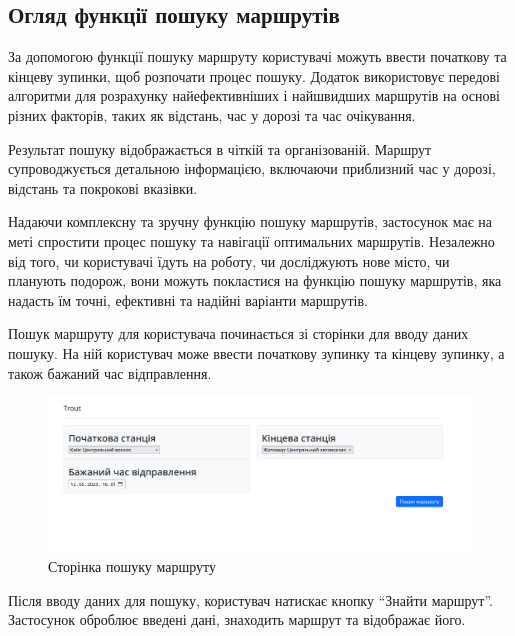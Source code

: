 \subsection{Огляд функції пошуку маршрутів}
\label{subsec:route-management-subsection}

За допомогою функції пошуку маршруту користувачі можуть ввести початкову та кінцеву зупинки, щоб розпочати процес пошуку. Додаток використовує передові алгоритми для розрахунку найефективніших і найшвидших маршрутів на основі різних факторів, таких як відстань, час у дорозі та час очікування.

Результат пошуку відображається в чіткій та організованій. Маршрут супроводжується детальною інформацією, включаючи приблизний час у дорозі, відстань та покрокові вказівки.

Надаючи комплексну та зручну функцію пошуку маршрутів, застосунок має на меті спростити процес пошуку та навігації оптимальних маршрутів. Незалежно від того, чи користувачі їдуть на роботу, чи досліджують нове місто, чи планують подорож, вони можуть покластися на функцію пошуку маршрутів, яка надасть їм точні, ефективні та надійні варіанти маршрутів.

Пошук маршруту для користувача починається зі сторінки для вводу даних пошуку. На ній користувач може ввести початкову зупинку та кінцеву зупинку, а також бажаний час відправлення.

\begin{figure}[!htp]
	\centering
	\includegraphics[scale=0.3]{content/chapters/4-results/assets/img/example1_search.png}
	\caption{Сторінка пошуку маршруту}
	\label{fig:search_page}
\end{figure}


Після вводу даних для пошуку, користувач натискає кнопку ``Знайти маршрут''. Застосунок оброблює введені дані, знаходить маршрут та відображає його.

